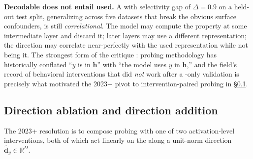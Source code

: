 \begin{contradiction}
\textbf{Decodable does not entail used.} A  with selectivity
gap of $\Delta = 0.9$ on a held-out test split, generalizing across
five datasets that break the obvious surface confounders, is still
\emph{correlational}. The model may compute the property at some
intermediate layer and discard it; later layers may use a different
representation; the  direction may correlate near-perfectly with
the used representation while not being it. The strongest form of the
critique \citep[\S abstract]{belinkov2022-probing-survey}: probing
methodology has historically conflated ``$y$ is in $\mathbf{h}$''
with ``the model uses $y$ in $\mathbf{h}$,'' and the field's record
of behavioral interventions that did \emph{not} work after a
-only validation is precisely what motivated the 2023+ pivot to
intervention-paired probing in \S\ref{sec:ablate-add}.
\end{contradiction}

\subsection{Direction ablation and direction addition}
\label{sec:ablate-add}

The 2023+ resolution is to compose probing with one of two
activation-level interventions, both of which act linearly on the
 along a unit-norm  direction
$\hat{\mathbf{d}}_y \in \mathbb{R}^D$.

